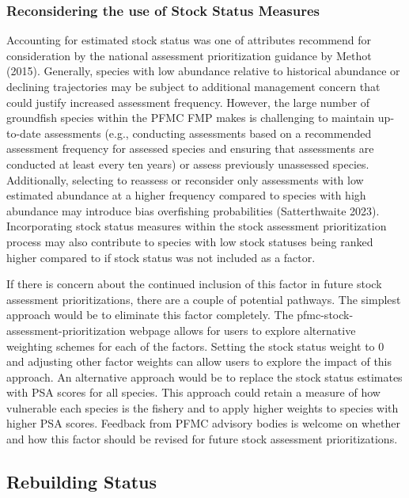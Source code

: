 \documentclass[11pt,
  english,
  a4paper,
]{article}
\begin{document}
\hypertarget{reconsidering-the-use-of-stock-status-measures}{%
\subsubsection{Reconsidering the use of Stock Status Measures}\label{reconsidering-the-use-of-stock-status-measures}}

Accounting for estimated stock status was one of attributes recommend for consideration by the national assessment prioritization guidance by Methot (2015). Generally, species with low abundance relative to historical abundance or declining trajectories may be subject to additional management concern that could justify increased assessment frequency. However, the large number of groundfish species within the PFMC FMP makes is challenging to maintain up-to-date assessments (e.g., conducting assessments based on a recommended assessment frequency for assessed species and ensuring that assessments are conducted at least every ten years) or assess previously unassessed species. Additionally, selecting to reassess or reconsider only assessments with low estimated abundance at a higher frequency compared to species with high abundance may introduce bias overfishing probabilities (Satterthwaite 2023). Incorporating stock status measures within the stock assessment prioritization process may also contribute to species with low stock statuses being ranked higher compared to if stock status was not included as a factor.

If there is concern about the continued inclusion of this factor in future stock assessment prioritizations, there are a couple of potential pathways. The simplest approach would be to eliminate this factor completely. The pfmc-stock-assessment-prioritization webpage allows for users to explore alternative weighting schemes for each of the factors. Setting the stock status weight to 0 and adjusting other factor weights can allow users to explore the impact of this approach. An alternative approach would be to replace the stock status estimates with PSA scores for all species. This approach could retain a measure of how vulnerable each species is the fishery and to apply higher weights to species with higher PSA scores. Feedback from PFMC advisory bodies is welcome on whether and how this factor should be revised for future stock assessment prioritizations.

\hypertarget{rebuilding-status}{%
\subsection{Rebuilding Status}\label{rebuilding-status}}
\end{document}
